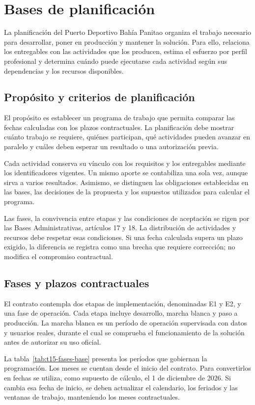 \section{Bases de planificación}\label{sec:t15-bases}
La planificación del Puerto Deportivo Bahía Panitao organiza el trabajo necesario para desarrollar, poner en producción y mantener la solución. Para ello, relaciona los entregables con las actividades que los producen, estima el esfuerzo por perfil profesional y determina cuándo puede ejecutarse cada actividad según sus dependencias y los recursos disponibles.

\subsection{Propósito y criterios de planificación}
El propósito es establecer un programa de trabajo que permita comparar las fechas calculadas con los plazos contractuales. La planificación debe mostrar cuánto trabajo se requiere, quiénes participan, qué actividades pueden avanzar en paralelo y cuáles deben esperar un resultado o una autorización previa.

Cada actividad conserva su vínculo con los requisitos y los entregables mediante los identificadores vigentes. Un mismo aporte se contabiliza una sola vez, aunque sirva a varios resultados. Asimismo, se distinguen las obligaciones establecidas en las bases, las decisiones de la propuesta y los supuestos utilizados para calcular el programa.

Las fases, la convivencia entre etapas y las condiciones de aceptación se rigen por las Bases Administrativas, artículos 17 y 18. La distribución de actividades y recursos debe respetar esas condiciones. Si una fecha calculada supera un plazo exigido, la diferencia se registra como una brecha que requiere corrección; no modifica el compromiso contractual.

\subsection{Fases y plazos contractuales}
El contrato contempla dos etapas de implementación, denominadas E1 y E2, y una fase de operación. Cada etapa incluye desarrollo, marcha blanca y paso a producción. La marcha blanca es un período de operación supervisada con datos y usuarios reales, durante el cual se comprueba el funcionamiento de la solución antes de autorizar su uso oficial.

La tabla~\ref{tab:t15-fases-base} presenta los períodos que gobiernan la programación. Los meses se cuentan desde el inicio del contrato. Para convertirlos en fechas se utiliza, como supuesto de cálculo, el 1 de diciembre de 2026. Si cambia esa fecha de inicio, se deben actualizar el calendario, los feriados y las ventanas de trabajo, manteniendo los meses contractuales.


